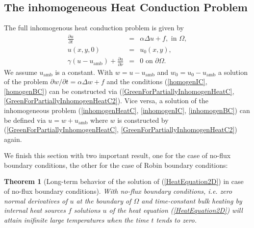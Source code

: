 \documentclass[a4paper,11pt]{article}
\theoremstyle{plain} %
\newtheorem{theorem}{Theorem}[section]
\theoremstyle{definition} %
\theoremstyle{remark} %
\theoremstyle{remark}
\def\uTemp{u}
\def\wTemp{w}
\def\Laplace{\Delta}
\begin{document}
\subsection{The inhomogeneous Heat Conduction Problem}
The full inhomogenous heat conduction problem is given by
\begin{eqnarray} \label{inhomogenHeatC}
\frac{\partial \uTemp }{\partial t } &=& \alpha\Laplace \uTemp + f , \text{ in } \Omega , \\
\uTemp (x,y,0 ) & = & \uTemp_0(x,y) \label{inhomogenIC} , \\
\gamma ( \uTemp - \uTemp_{\mathrm{amb}} ) + \frac{\partial \uTemp }{\partial \nu } &=& 0 \text{ on } \partial \Omega  \label{inhomogenBC} .
\end{eqnarray}
We assume $ \uTemp_{\mathrm{amb}} $ is a constant. With $ \wTemp = \uTemp - \uTemp_{\mathrm{amb}} $ and $ \wTemp_0 = \uTemp_0 - \uTemp_{\mathrm{amb}} $ a solution of the problem $ \partial \wTemp / \partial t = \alpha \Laplace \wTemp + f $ and the conditions (\ref{homogenIC}, \ref{homogenBC}) can be constructed via (\ref{GreenForPartiallyInhomogenHeatC}, \ref{GreenForPartiallyInhomogenHeatC2}). Vice versa, a solution of the inhomogeneous problem (\ref{inhomogenHeatC}, \ref{inhomogenIC}, \ref{inhomogenBC}) can be defined via $ \uTemp = \wTemp + \uTemp_{\mathrm{amb}} $ where $ \wTemp $ is constructed by (\ref{GreenForPartiallyInhomogenHeatC}, \ref{GreenForPartiallyInhomogenHeatC2}) again.

We finish this section with two important result, one for the case of no-flux boundary conditions, the other for the case of Robin boundary conditions:
%
\begin{theorem}[Long-term behavior of the solution of (\ref{HeatEquation2D}) in case of no-flux boundary conditions] \label{LT_no_flux}
With no-flux boundary conditions, i.e. zero normal derivatives of $\uTemp $ at the boundary of $\Omega $ and time-constant bulk heating by internal heat sources $f$ solutions $\uTemp $ of the heat equation (\ref{HeatEquation2D}) will attain inifinite large temperatures when the time $t$ tends to zero.
\end{theorem}
\end{document}
